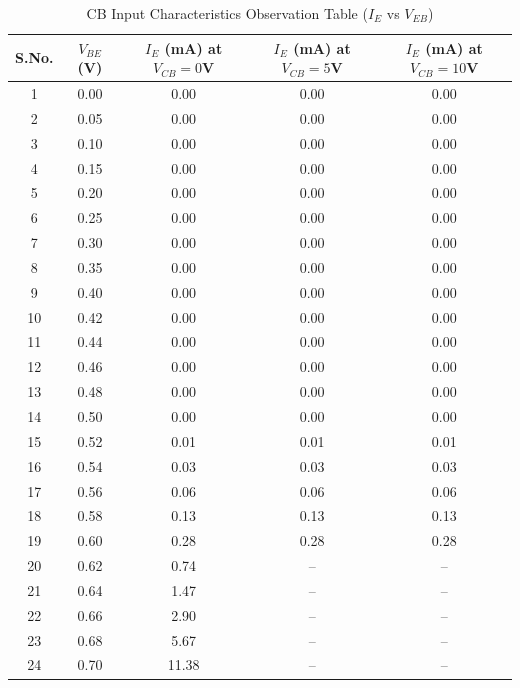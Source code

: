 \documentclass[11pt,a4paper]{article}
\begin{document}
\begin{longtable}{c c c c c}
\caption{CB Input Characteristics Observation Table ($I_E$ vs $V_{EB}$)}\label{tab:cb_input_readings_exp}\\
\toprule
\textbf{S.No.} & \textbf{$V_{BE}$ (V)} & \textbf{$I_E$ (mA) at $V_{CB}=0$V} & \textbf{$I_E$ (mA) at $V_{CB}=5$V} & \textbf{$I_E$ (mA) at $V_{CB}=10$V} \\
\midrule
\endhead
1 & 0.00 & 0.00 & 0.00 & 0.00 \\
2 & 0.05 & 0.00 & 0.00 & 0.00 \\
3 & 0.10 & 0.00 & 0.00 & 0.00 \\
4 & 0.15 & 0.00 & 0.00 & 0.00 \\
5 & 0.20 & 0.00 & 0.00 & 0.00 \\
6 & 0.25 & 0.00 & 0.00 & 0.00 \\
7 & 0.30 & 0.00 & 0.00 & 0.00 \\
8 & 0.35 & 0.00 & 0.00 & 0.00 \\
9 & 0.40 & 0.00 & 0.00 & 0.00 \\
10 & 0.42 & 0.00 & 0.00 & 0.00 \\
11 & 0.44 & 0.00 & 0.00 & 0.00 \\
12 & 0.46 & 0.00 & 0.00 & 0.00 \\
13 & 0.48 & 0.00 & 0.00 & 0.00 \\
14 & 0.50 & 0.00 & 0.00 & 0.00 \\
15 & 0.52 & 0.01 & 0.01 & 0.01 \\
16 & 0.54 & 0.03 & 0.03 & 0.03 \\
17 & 0.56 & 0.06 & 0.06 & 0.06 \\
18 & 0.58 & 0.13 & 0.13 & 0.13 \\
19 & 0.60 & 0.28 & 0.28 & 0.28 \\
20 & 0.62 & 0.74 & -- & -- \\
21 & 0.64 & 1.47 & -- & -- \\
22 & 0.66 & 2.90 & -- & -- \\
23 & 0.68 & 5.67 & -- & -- \\
24 & 0.70 & 11.38 & -- & -- \\
\bottomrule
\end{longtable}
\end{document}
